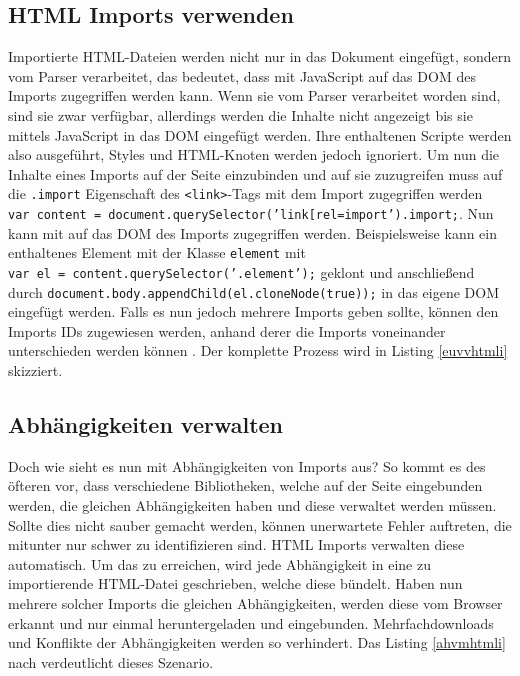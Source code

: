 \subsection{HTML Imports verwenden}\label{html-imports-verwenden}

Importierte \ac{HTML}-Dateien werden nicht nur in das Dokument eingefügt, sondern vom Parser verarbeitet, das bedeutet, dass mit JavaScript auf das \ac{DOM} des Imports zugegriffen werden kann. Wenn sie vom Parser verarbeitet worden sind, sind sie zwar verfügbar, allerdings werden die Inhalte nicht angezeigt bis sie mittels JavaScript in das \ac{DOM} eingefügt werden. Ihre enthaltenen Scripte werden also ausgeführt, Styles und \ac{HTML}-Knoten werden jedoch ignoriert. Um nun die Inhalte eines Imports auf der Seite einzubinden und auf sie zuzugreifen muss auf die \texttt{.import} Eigenschaft des \texttt{\textless{}link\textgreater{}}-Tags mit dem Import zugegriffen werden \texttt{var\ content\ =\ document.querySelector('link{[}rel=\dq import\dq{]}').import;}. Nun kann mit auf das \ac{DOM} des Imports zugegriffen werden. Beispielsweise kann ein enthaltenes Element mit der Klasse \texttt{element} mit \texttt{var\ el\ =\ content.querySelector('.element');} geklont und anschließend durch \texttt{document.body.appendChild(el.cloneNode(true));} in das eigene \ac{DOM} eingefügt werden. Falls es nun jedoch mehrere Imports geben sollte, können den Imports IDs zugewiesen werden, anhand derer die Imports voneinander unterschieden werden können \cite{citeulike:13853724}. Der komplette Prozess wird in Listing \ref{euvvhtmli} skizziert.




\subsection{Abhängigkeiten verwalten}\label{abhuxe4ngigkeiten-verwalten}

Doch wie sieht es nun mit Abhängigkeiten von Imports aus? So kommt es des öfteren vor, dass verschiedene Bibliotheken, welche auf der Seite eingebunden werden, die gleichen Abhängigkeiten haben und diese verwaltet werden müssen. Sollte dies nicht sauber gemacht werden, können unerwartete Fehler auftreten, die mitunter nur schwer zu identifizieren sind. \ac{HTML} Imports verwalten diese automatisch. Um das zu erreichen, wird jede Abhängigkeit in eine zu importierende \ac{HTML}-Datei geschrieben, welche diese bündelt. Haben nun mehrere solcher Imports die gleichen Abhängigkeiten, werden diese vom Browser erkannt und nur einmal heruntergeladen und eingebunden. Mehrfachdownloads und Konflikte der Abhängigkeiten werden so verhindert. Das Listing \ref{ahvmhtmli} nach \cite{citeulike:13853700} verdeutlicht dieses Szenario.


